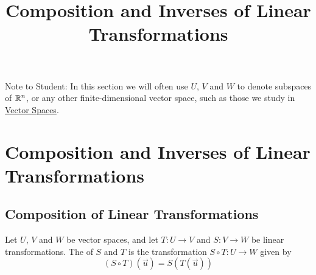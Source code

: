 \documentclass{ximera}
\title{Composition and Inverses of Linear Transformations} \license{CC BY-NC-SA 4.0}
\begin{document}
\begin{abstract}
 
\end{abstract}
\maketitle

Note to Student:  In this section we will often use $U$, $V$ and $W$ to denote subspaces of $\mathbb{R}^n$, or any other finite-dimensional vector space, such as those we study in \href{https://ximera.osu.edu/oerlinalg/LinearAlgebra/XLAChapter_vecSpaces/main}{Vector Spaces}. 

\section*{Composition and Inverses of Linear Transformations}

\subsection*{Composition of Linear Transformations}
\begin{definition}\label{def:compoflintrans} Let $U$, $V$ and $W$ be vector spaces, and let $T:U\rightarrow V$ and $S:V\rightarrow W$ be linear transformations.  The  of $S$ and $T$ is the transformation $S\circ T:U\rightarrow W$ given by
$$(S\circ T)(\vec{u})=S(T(\vec{u}))$$
\end{definition}
\end{document}
